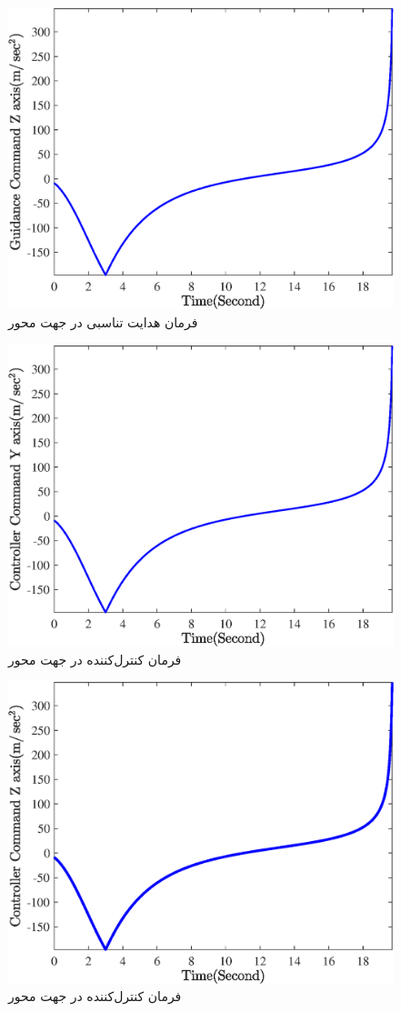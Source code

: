 \begin{figure}[H]
	\centering
	\includegraphics[width=.75\linewidth]{../Figure/Q1/a/GC_z}
	\caption{فرمان هدایت تناسبی در جهت محور }
\end{figure}

\begin{figure}[H]
	\centering
	\includegraphics[width=.75\linewidth]{../Figure/Q1/a/CC_y}
	\caption{فرمان کنترل‌کننده در جهت محور }
\end{figure}

\begin{figure}[H]
	\centering
	\includegraphics[width=.75\linewidth]{../Figure/Q1/a/CC_z}
	\caption{فرمان کنترل‌کننده در جهت محور }
\end{figure}


